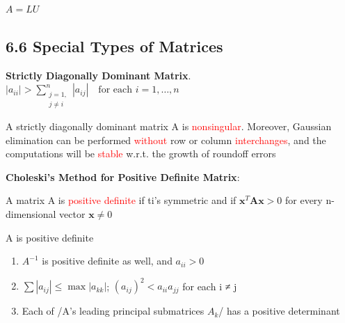 \documentclass[11pt]{article}
\begin{document}
\(A=LU\)
\subsection{6.6 Special Types of Matrices}
\label{sec:org76c1cc2}
\textbf{Strictly Diagonally Dominant Matrix}.
\(|a_{ii}|>\displaystyle\sum_{\substack{j=1,\\j\neq i}}^n|a_{ij}| \quad
   \text{for each } i=1,\dots,n\)

\begin{theorem}
A strictly diagonally dominant matrix A is \textcolor{red}{nonsingular}. Moreover,
Gaussian elimination can be performed \textcolor{red}{without} row or column
\textcolor{red}{interchanges}, and the computations will be \textcolor{red}{stable}
w.r.t. the growth of roundoff errors
\end{theorem}

\textbf{Choleski's Method for Positive Definite Matrix}:
\begin{definition}
A matrix A is \textcolor{red}{positive definite} if ti's symmetric and if    
$ \mathbf{x}^T \mathbf{A} \mathbf{x}>0$ for every n-dimensional vector $ \mathbf{x}\neq 0$
\end{definition}

\begin{lemma}
A is positive definite
\begin{enumerate}
\item $A^{-1}$ is positive definite as well, and $a_{ii}>0$
\item $\sum|a_{ij}|\le\max|a_{kk}|$; $(a_{ij})^2<a_{ii}a_{jj}$ for each i ≠ j
\item Each of /A's leading principal submatrices $A_k$/ has a positive determinant
\end{enumerate}
\end{lemma}
\end{document}
